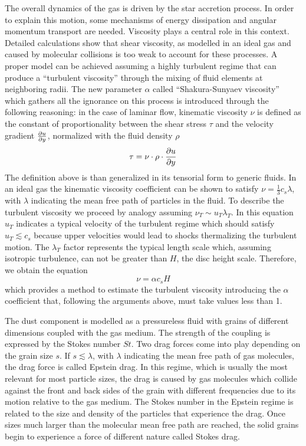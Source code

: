 \documentclass[a4paper,10pt]{report}
\begin{document}
The overall dynamics of the gas is driven by the star accretion process. In order to explain this motion, some mechanisms of energy dissipation and angular momentum transport
are needed. Viscosity plays a central role in this context. Detailed calculations show that shear viscosity, 
as modelled in an ideal gas and caused by molecular collisions is too weak to account for these processes. 
A proper model can be achieved assuming a highly turbulent regime that can produce a ``turbulent viscosity'' through the mixing of fluid elements
at neighboring radii. The new parameter $\alpha$
called ``Shakura-Sunyaev viscosity'' which gathers all the ignorance on this process is introduced through the following reasoning:
in the case of laminar flow, kinematic viscosity $\nu$ is defined as the constant of 
proportionality between the shear stress $\tau$ and the velocity gradient  $\pdv{u}{y}$, normalized with the fluid density $\rho$
\begin{equation}
    \tau = \nu \cdot \rho \cdot \pdv{u}{y}
\end{equation}
The definition above is than generalized in its tensorial form to generic fluids.
In an ideal gas the kinematic viscosity coefficient can be shown to satisfy $\nu = \frac{1}{3}c_s\lambda$,
with $\lambda$ indicating the mean free path of particles in the fluid.
To describe the turbulent viscosity we proceed by analogy assuming $\nu_T \sim u_T \lambda_T$. In this equation $u_T$ indicates a typical velocity of the turbulent regime
which should 
satisfy $u_T \lesssim c_s$ because upper velocities would lead to shocks thermalizing the turbulent motion.
The $\lambda_T$ factor 
represents the typical length scale which, assuming isotropic turbulence, can not be greater than $H$, the disc height scale.
Therefore, we obtain the equation
\begin{equation}
    \nu = \alpha c_s H
\end{equation}
which provides a method to estimate the turbulent viscosity introducing the $\alpha$ coefficient that, following the arguments above,
must take values less than 1.

The dust component is modelled as a pressureless fluid with grains of different dimensions coupled with the gas medium. 
The strength of the coupling is expressed by the Stokes number $St$.
Two drag forces come into play depending on the grain size $s$. 
If $s \lesssim \lambda$, with $\lambda$ indicating the mean free path of gas molecules, 
the drag force is called Epstein drag. 
In this regime, which is usually the most relevant for most particle sizes, 
the drag is caused by gas molecules which collide against the front and back sides of the grain with different 
frequencies due to its motion relative to the gas medium.
The Stokes number in the Epstein regime is related to the size and density of the particles that experience the drag.
Once sizes much larger than the molecular 
mean free path are reached, the solid grains begin to experience a force of different nature called Stokes drag.
\end{document}
